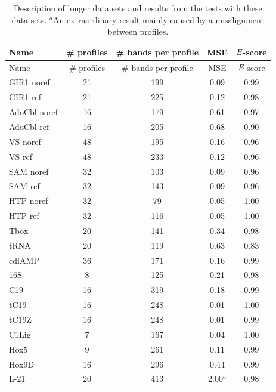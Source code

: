 \documentclass[letter]{bioinfo}
\newcommand{\escore}{{\emph{E}}}
\begin{document}
\begin{center}
\begin{longtable}{l cccc}

\caption{Description of longer data sets and results from the tests with these data sets. $^a$An extraordinary result mainly caused by a misalignment between profiles.} \label{t:additional_data_sets} \\

Name & \# profiles & \# bands per profile & MSE & $\escore$-score \\
\hline
\endfirsthead
Name & \# profiles & \# bands per profile & MSE & $\escore$-score \\
\endhead
\endfoot
\endlastfoot

GIR1 noref 	& 21 & 199 & 0.09 & 0.99 \\
GIR1 ref 		& 21 & 225 & 0.12 & 0.98 \\
AdoCbl noref 	& 16 & 179 & 0.61 & 0.97 \\
AdoCbl ref 	& 16 & 205 & 0.68 & 0.90 \\
VS noref 		& 48 & 195 & 0.16 & 0.96 \\
VS ref 		& 48 & 233 & 0.12 & 0.96 \\
SAM noref 	& 32 & 103 & 0.09 & 0.96 \\
SAM ref 		& 32 & 143 & 0.09 & 0.96 \\
HTP noref 	& 32 & 79  & 0.05 & 1.00 \\
HTP ref 		& 32 & 116 & 0.05 & 1.00 \\
Tbox 		& 20 & 141 & 0.34 & 0.98 \\
tRNA 		& 20 & 119 & 0.63 & 0.83 \\
cdiAMP 		& 36 & 171 & 0.16 & 0.99 \\
16S 			& 8  & 125 & 0.21 & 0.98 \\
C19 			& 16 & 319 & 0.18 & 0.99 \\
tC19 		& 16 & 248 & 0.01 & 1.00 \\
tC19Z 		& 16 & 248 & 0.01 & 0.99 \\
C1Lig 		& 7  & 167 & 0.04 & 1.00 \\
Hox5 		& 9  & 261 & 0.11 & 0.99 \\
Hox9D 		& 16 & 296 & 0.44 & 0.99 \\
L-21			& 20 & 413 & 2.00$^a$ & 0.98 \\
\end{longtable}
\end{center}
\end{document}
